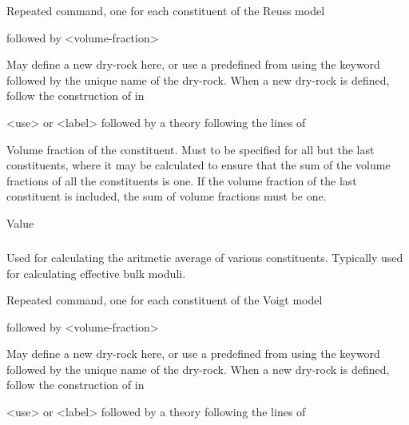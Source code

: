 {
 \slist
   \item \Description Repeated command, one for each constituent of the Reuss model
   \item {} followed by <volume-fraction>
   \item \Default
 \elist

 \slist
   \item \Description May define a new dry-rock here, or use a predefined  from  using the keyword  followed by the unique name of the dry-rock. When a new dry-rock is defined, follow the construction of  in 
   \item \Argument <use> or <label> followed by a theory following the lines of 
   \item \Default
 \elist

 \slist
   \item \Description Volume fraction of the constituent. Must to be specified for all but the last constituents, where it may be calculated to ensure that the sum of the volume fractions of all the constituents is one. If the volume fraction of the last constituent is included, the sum of volume fractions must be one. 
   \item \Argument Value
   \item \Default
 \elist

\subparagraph{}
 \slist
   \item \Description Used for calculating the aritmetic average of various constituents. Typically used for calculating effective bulk moduli. 
   \item \Argument
   \item \Default 
 \elist

 \slist
   \item \Description Repeated command, one for each constituent of the Voigt model
   \item {} followed by <volume-fraction>
   \item \Default
 \elist

 \slist
   \item \Description May define a new dry-rock here, or use a predefined  from  using the keyword  followed by the unique name of the dry-rock. When a new dry-rock is defined, follow the construction of  in 
   \item \Argument <use> or <label> followed by a theory following the lines of 
   \item \Default
 \elist

}
